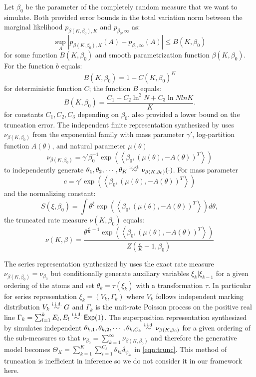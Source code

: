 \documentclass[letterpaper]{article}
\begin{document}
Let $\beta_0$ be the parameter of the completely random measure that we want to simulate. Both \cite{campbell19,nguyen20} provided error bounds in the total variation norm between the marginal likelihood $p_{\beta(K,\beta_0),K}$ and $p_{\beta_0,\infty}$ as:
\[
	\sup_A\left|p_{\beta(K,\beta_0),K}(A)-p_{\beta_0,\infty}(A)\right|\le B(K,\beta_0)
\]
for some function $B(K,\beta_0)$ and smooth parametrization function $\beta(K,\beta_0)$. For \cite{campbell19} the function $b$ equals:
\[
	B(K,\beta_0)=1-C(K,\beta_0)^K
\]
for deterministic function $C$; \cite{nguyen20} the function $B$ equals:
\[
	B(K,\beta_0)=\frac{C_1+C_2\ln^2N+C_3\ln Nln K}{K}.
\]
for constants $C_1,C_2,C_3$ depending on $\beta_0$. \cite{nguyen20} also provided a lower bound on the truncation error. The independent finite representation synthesized by \cite{nguyen20} uses $\nu_{\beta(K,\beta_0)}$ from the exponential family \cite{broderick18} with mass parameter $\gamma'$, log-partition function $A(\theta)$, and natural parameter $\mu(\theta)$ 
\[
	\nu_{\beta(K,\beta_0)}=\gamma'\beta_0^{-1}\exp\left(\left<\beta_0,\left(\mu(\theta),-A(\theta)\right)^T\right>\right)
\]
to independently generate $\theta_1,\theta_2,\cdots,\theta_K\distiid\nu_{\beta(K,\beta_0)}(\cdot)$.  For mass parameter 
\[
	c=\gamma'\exp\left(\left<\beta_0,\left(\mu(\theta),-A(\theta)\right)^T\right>\right)
\] and the normalizing constant:
\[
	S(\xi,\beta_0)=\int\theta^\xi\exp\left(\left<\beta_0,\left(\mu(\theta),-A(\theta)\right)^T\right>\right)d\theta,
\] 
the truncated rate measure $\nu(K,\beta_0)$ equals:
\[
	\nu(K,\beta)=\frac{\theta^{\frac{c}{K}-1}\exp\left(\left<\beta_0,\left(\mu(\theta),-A(\theta)\right)^T\right>\right)}{Z\left(\frac{c}{K}-1,\beta_0\right)}
\] 

The series representation synthesized by \cite{campbell19} uses the exact rate measure $\nu_{\beta(K,\beta_0)}=\nu_{\beta_0}$ but conditionally generate auxiliary variables $\xi_k|\xi_{k-1}$ for a given ordering of the atoms and set $\theta_k=\tau(\xi_k)$ with a transformation $\tau$. In particular for series representation $\xi_k=(V_k,\Gamma_k)$ where $V_k$ follows independent marking distribution $V_k\distiid G$ and $\Gamma_k$ is the unit-rate Poisson process on the positive real line $\Gamma_k=\sum_{l=1}^kE_l,E_l\distiid\distExp(1)$. The superposition representation synthesized by \cite{campbell19} simulates independent $\theta_{k,1},\theta_{k,2},\cdots,\theta_{k,C_k}\distiid\nu_{\beta(K,\beta_0)}$ for a given ordering of the sub-measures so  that $\nu_{\beta_0}=\sum_{k=1}^\infty\nu_{\beta(K,\beta_0)}$ and therefore the generative model becomes $\Theta_K=\sum_{k=1}^K\sum_{i=1}^{C_k}\theta_{ki}\delta_{\psi_{ki}}$ in \ref{eqn:trunc}. This method of truncation is inefficient in inference \cite{zhu20,nguyen20} so we do not consider it in our framework here. 
\end{document}
